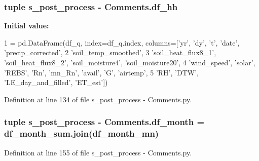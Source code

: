 \subsubsection[{df\+\_\+hh}]{\setlength{\rightskip}{0pt plus 5cm}tuple s\+\_\+post\+\_\+process -\/ Comments.\+df\+\_\+hh}\label{namespaces__post__process_01-_01_comments_a799dd3cc5b8e24283cbce5d20d97168b}
{\bfseries Initial value\+:}
\begin{DoxyCode}
1 = pd.DataFrame(df\_q, index=df\_q.index, columns=[\textcolor{stringliteral}{'yr'}, \textcolor{stringliteral}{'dy'}, \textcolor{stringliteral}{'t'}, \textcolor{stringliteral}{'date'}, \textcolor{stringliteral}{'precip\_corrected'},
2                         \textcolor{stringliteral}{'soil\_temp\_smoothed'},
3                         \textcolor{stringliteral}{'soil\_heat\_flux8\_1'}, \textcolor{stringliteral}{'soil\_heat\_flux8\_2'}, \textcolor{stringliteral}{'soil\_moisture4'}, \textcolor{stringliteral}{'soil\_moisture20'},
4                         \textcolor{stringliteral}{'wind\_speed'}, \textcolor{stringliteral}{'solar'}, \textcolor{stringliteral}{'REBS'}, \textcolor{stringliteral}{'Rn'}, \textcolor{stringliteral}{'mn\_Rn'}, \textcolor{stringliteral}{'avail'}, \textcolor{stringliteral}{'G'}, \textcolor{stringliteral}{'airtemp'},
5                         \textcolor{stringliteral}{'RH'}, \textcolor{stringliteral}{'DTW'}, \textcolor{stringliteral}{'LE\_day\_and\_filled'}, \textcolor{stringliteral}{'ET\_est'}])
\end{DoxyCode}


Definition at line 134 of file s\+\_\+post\+\_\+process -\/ Comments.\+py.

\hypertarget{namespaces__post__process_01-_01_comments_a0c297e8e03d58f418d0c814d57970854}{}
\subsubsection[{df\+\_\+month}]{\setlength{\rightskip}{0pt plus 5cm}tuple s\+\_\+post\+\_\+process -\/ Comments.\+df\+\_\+month = df\+\_\+month\+\_\+sum.\+join({\bf df\+\_\+month\+\_\+mn})}\label{namespaces__post__process_01-_01_comments_a0c297e8e03d58f418d0c814d57970854}


Definition at line 155 of file s\+\_\+post\+\_\+process -\/ Comments.\+py.

